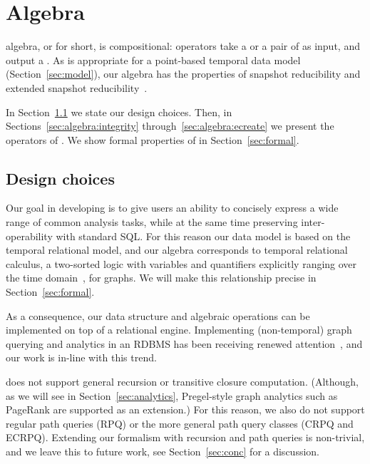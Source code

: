 \section{Algebra}
\label{sec:algebra}
\setlength{\textfloatsep}{5pt}%

\tg algebra, or \tga for short, is compositional: operators take a \tg
or a pair of \tgs as input, and output a \tg.  As is appropriate for a
point-based temporal data model (Section~\ref{sec:model}), our algebra
has the properties of snapshot reducibility and extended snapshot
reducibility~\cite{DBLP:reference/db/Bohlen092}.

In Section~\ref{sec:algebra:prelim} we state our design choices.
Then, in Sections~\ref{sec:algebra:integrity}
through~\ref{sec:algebra:ecreate} we present the operators of \tga.
We show formal properties of \tga in Section~\ref{sec:formal}.

\subsection{Design choices}
\label{sec:algebra:prelim}

Our goal in developing \tga is to give users an ability to concisely
express a wide range of common analysis tasks, while at the same time
preserving inter-operability with standard SQL.  For this reason our
data model is based on the temporal relational model, and our algebra
corresponds to temporal relational calculus, a two-sorted logic with
variables and quantifiers explicitly ranging over the time
domain~\cite{DBLP:reference/db/Toman09}, for graphs.  We will make
this relationship precise in Section~\ref{sec:formal}.

As a consequence, our data structure and algebraic operations can be
implemented on top of a relational engine.  Implementing
(non-temporal) graph querying and analytics in an RDBMS has been
receiving renewed
attention~\cite{DBLP:conf/sigmod/AbergerTOR16,DBLP:conf/sigmod/SunFSKHX15,DBLP:journals/pvldb/Xirogiannopoulos15},
and our work is in-line with this trend.


\tga does not support general recursion or transitive closure
computation. (Although, as we will see in Section~\ref{sec:analytics},
Pregel-style graph analytics such as PageRank are supported as an
extension.)  For this reason, we also do not support regular path
queries (RPQ) or the more general path query classes (CRPQ and ECRPQ).
Extending our formalism with recursion and path queries is
non-trivial, and we leave this to future work, see
Section~\ref{sec:conc} for a discussion.

